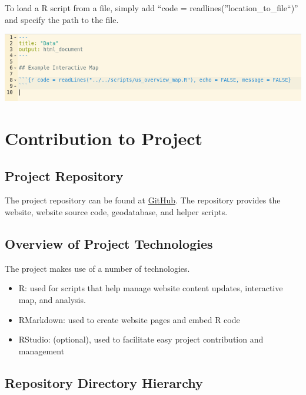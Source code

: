 \documentclass[
]{book}
\providecommand{\tightlist}{%
  \setlength{\itemsep}{0pt}\setlength{\parskip}{0pt}}
\begin{document}
To load a R script from a file, simply add ``code = readlines(''location\_to\_file``)'' and specify the path to the file.

\includegraphics{images/04-example2_3.png}

\hypertarget{contribution-to-project}{%
\chapter{Contribution to Project}\label{contribution-to-project}}

\hypertarget{project-repository}{%
\section{Project Repository}\label{project-repository}}

The project repository can be found at \href{https://github.com/Peter-Kedron/COVID-19-Digital-Contact-Tracing-and-Geospatial-Technologies-and-Privacy}{GitHub}. The repository provides the website, website source code, geodatabase, and helper scripts.

\hypertarget{overview-of-project-technologies}{%
\section{Overview of Project Technologies}\label{overview-of-project-technologies}}

The project makes use of a number of technologies.

\begin{itemize}
\tightlist
\item
  R: used for scripts that help manage website content updates, interactive map, and analysis.
\item
  RMarkdown: used to create website pages and embed R code
\item
  RStudio: (optional), used to facilitate easy project contribution and management
\end{itemize}

\hypertarget{repository-directory-hierarchy}{%
\section{Repository Directory Hierarchy}\label{repository-directory-hierarchy}}
\end{document}
